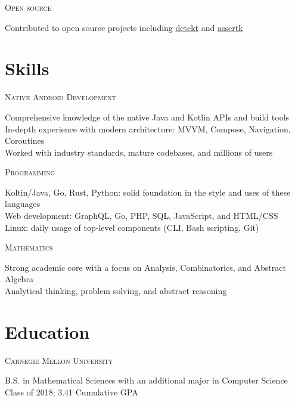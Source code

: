 \documentclass[letterpaper,10pt]{article}
\newcommand{\lb}{\vspace{4pt} \\}
\newenvironment{resumecols1}[1]
{
    \begin{minipage}[t]{.21\linewidth}
        \begin{flushright}
            \textsc{#1}
        \end{flushright}
    \end{minipage}
    \hspace{.004\linewidth}
    \begin{minipage}[t]{.775\linewidth}
}
{
    \end{minipage}
}
\begin{document}
\begin{resumecols1}{Open source}
    Contributed to open source projects including \href{https://github.com/detekt/detekt/issues?q=author\%3Adzirbel}{\underline{detekt}} and \href{https://github.com/willowtreeapps/assertk/issues?q=author\%3Adzirbel}{\underline{assertk}}
\end{resumecols1}

\section{Skills}

\begin{resumecols1}{Native Android Development}
    Comprehensive knowledge of the native Java and Kotlin APIs and build tools \\
    In-depth experience with modern architecture: MVVM, Compose, Navigation, Coroutines \\
    Worked with industry standards, mature codebases, and millions of users
\end{resumecols1}

\vspace{6pt}

\begin{resumecols1}{Programming}
    Koltin/Java, Go, Rust, Python: solid foundation in the style and uses of these languages \\
    Web development: GraphQL, Go, PHP, SQL, JavaScript, and HTML/CSS \\
    Linux: daily usage of top-level components (CLI, Bash scripting, Git)
\end{resumecols1}

\vspace{6pt}

\begin{resumecols1}{Mathematics}
    Strong academic core with a focus on Analysis, Combinatorics, and Abstract Algebra \\
    Analytical thinking, problem solving, and abstract reasoning
\end{resumecols1}

\section{Education}

\begin{resumecols1}{Carnegie Mellon University}
    B.S. in Mathematical Sciences with an additional major in Computer Science
    \lb
    Class of 2018; 3.41 Cumulative GPA
\end{resumecols1}
\end{document}
